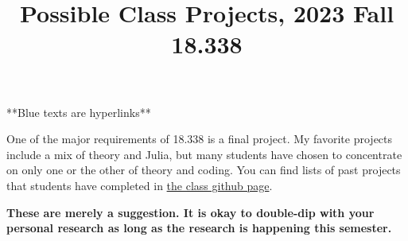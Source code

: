 \documentclass{article}
\title{Possible Class Projects, 2023 Fall 18.338}
\begin{document}
\maketitle




{\color{blue} **Blue texts are hyperlinks**}


One of the major requirements of 18.338 is a final project.  My favorite projects include a mix of theory and Julia, but many students have chosen to concentrate
on only one or the other of theory and coding.  You can find lists of past projects that students have completed in \href{https://github.com/mitmath/18338#previous-projects}{\color{blue} the class github page}.  

\textbf{These are merely a suggestion. It is okay to double-dip with your personal research as long as the research is happening this semester.}
\end{document}
